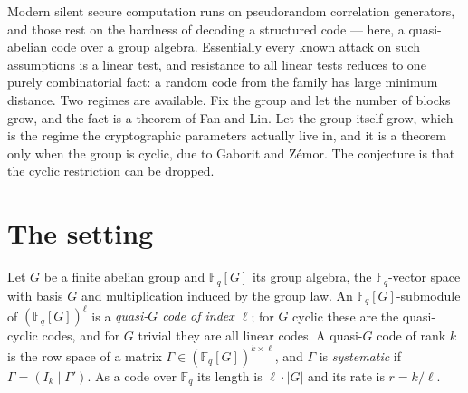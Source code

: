\documentclass{aicr-conjecture}
\newcommand{\Fq}{\mathbb{F}_{q}}
\newcommand{\FqG}{\mathbb{F}_{q}[G]}
\begin{document}

\vspace{0.4em}

\begin{informalconjecture}
Modern silent secure computation runs on pseudorandom correlation
generators, and those rest on the hardness of decoding a structured code
--- here, a quasi-abelian code over a group algebra. Essentially every
known attack on such assumptions is a linear test, and resistance to all
linear tests reduces to one purely combinatorial fact: a random code from
the family has large minimum distance. Two regimes are available. Fix the
group and let the number of blocks grow, and the fact is a theorem of Fan
and Lin. Let the group itself grow, which is the regime the cryptographic
parameters actually live in, and it is a theorem only when the group is
cyclic, due to Gaborit and Z\'emor. The conjecture is that the cyclic
restriction can be dropped.
\end{informalconjecture}

\section{The setting}\label{sec:setting}

Let $G$ be a finite abelian group and $\FqG$ its group algebra, the
$\Fq$-vector space with basis $G$ and multiplication induced by the group
law. An $\FqG$-submodule of $(\FqG)^{\ell}$ is a \emph{quasi-$G$ code of
index $\ell$}; for $G$ cyclic these are the quasi-cyclic codes, and for
$G$ trivial they are all linear codes. A quasi-$G$ code of rank $k$ is
the row space of a matrix $\Gamma \in (\FqG)^{k \times \ell}$, and
$\Gamma$ is \emph{systematic} if $\Gamma = (I_k \mid \Gamma')$. As a
code over $\Fq$ its length is $\ell \cdot |G|$ and its rate is
$r = k/\ell$.
\end{document}
